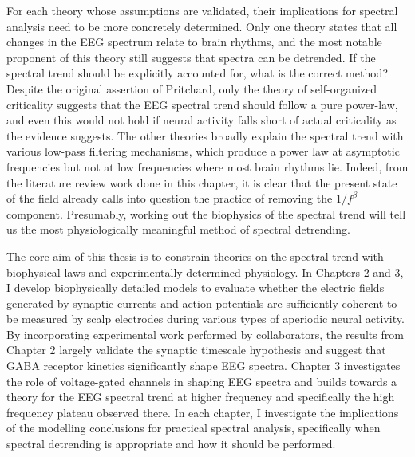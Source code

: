 For each theory whose assumptions are validated, their implications for spectral analysis need to be more concretely determined. Only one theory states that all changes in the EEG spectrum relate to brain rhythms, and the most notable proponent of this theory still suggests that spectra can be detrended. If the spectral trend should be explicitly accounted for, what is the correct method? Despite the original assertion of Pritchard, only the theory of self-organized criticality suggests that the EEG spectral trend should follow a pure power-law, and even this would not hold if neural activity falls short of actual criticality as the evidence suggests. The other theories broadly explain the spectral trend with various low-pass filtering mechanisms, which produce a power law at asymptotic frequencies but not at low frequencies where most brain rhythms lie. Indeed, from the literature review work done in this chapter, it is clear that the present state of the field already calls into question the practice of removing the $1/f^\beta$ component. Presumably, working out the biophysics of the spectral trend will tell us the most physiologically meaningful method of spectral detrending.

The core aim of this thesis is to constrain theories on the spectral trend with biophysical laws and experimentally determined physiology. In Chapters 2 and 3, I develop biophysically detailed models to evaluate whether the electric fields generated by synaptic currents and action potentials are sufficiently coherent to be measured by scalp electrodes during various types of aperiodic neural activity. By incorporating experimental work performed by collaborators, the results from Chapter 2 largely validate the synaptic timescale hypothesis and suggest that GABA receptor kinetics significantly shape EEG spectra. Chapter 3 investigates the role of voltage-gated channels in shaping EEG spectra and builds towards a theory for the EEG spectral trend at higher frequency and specifically the high frequency plateau observed there. In each chapter, I investigate the implications of the modelling conclusions for practical spectral analysis, specifically when spectral detrending is appropriate and how it should be performed.